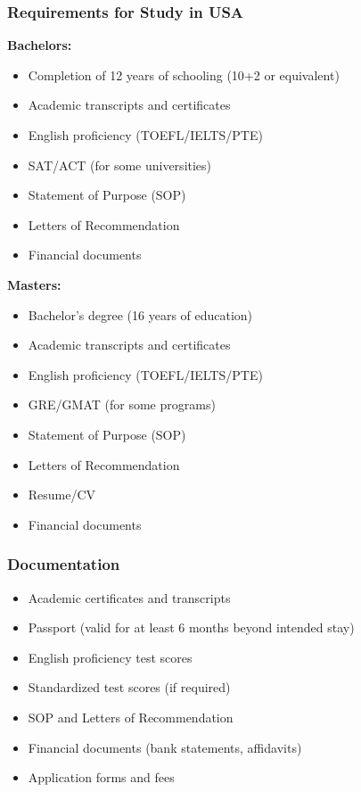 \subsubsection{Requirements for Study in USA}
\textbf{Bachelors:}
\begin{itemize}
    \item Completion of 12 years of schooling (10+2 or equivalent)
    \item Academic transcripts and certificates
    \item English proficiency (TOEFL/IELTS/PTE)
    \item SAT/ACT (for some universities)
    \item Statement of Purpose (SOP)
    \item Letters of Recommendation
    \item Financial documents
\end{itemize}
\textbf{Masters:}
\begin{itemize}
    \item Bachelor’s degree (16 years of education)
    \item Academic transcripts and certificates
    \item English proficiency (TOEFL/IELTS/PTE)
    \item GRE/GMAT (for some programs)
    \item Statement of Purpose (SOP)
    \item Letters of Recommendation
    \item Resume/CV
    \item Financial documents
\end{itemize}

\subsubsection{Documentation}
\begin{itemize}
    \item Academic certificates and transcripts
    \item Passport (valid for at least 6 months beyond intended stay)
    \item English proficiency test scores
    \item Standardized test scores (if required)
    \item SOP and Letters of Recommendation
    \item Financial documents (bank statements, affidavits)
    \item Application forms and fees
\end{itemize}


